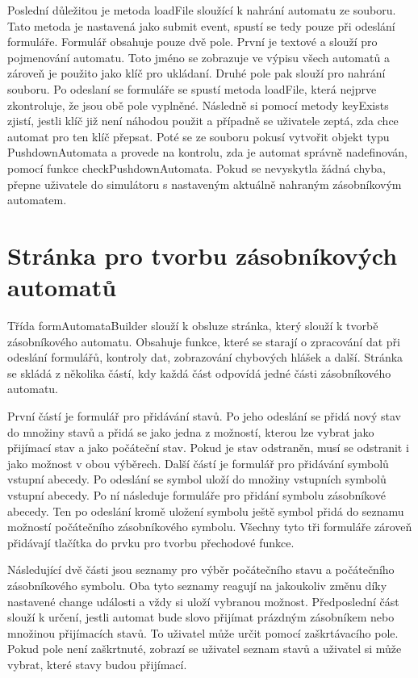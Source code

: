 Poslední důležitou je metoda loadFile sloužící k nahrání automatu ze souboru. Tato metoda je nastavená jako submit event, spustí se tedy pouze při odeslání formuláře. Formulář obsahuje pouze dvě pole. První je textové a slouží pro pojmenování automatu. Toto jméno se zobrazuje ve výpisu všech automatů a zároveň je použito jako klíč pro ukládaní. Druhé pole pak slouží pro nahrání souboru. Po odeslaní se formuláře se spustí metoda loadFile, která nejprve zkontroluje, že jsou obě pole vyplněné. Následně si pomocí metody keyExists zjistí, jestli klíč již není náhodou použit a případně se uživatele zeptá, zda chce automat pro ten klíč přepsat. Poté se ze souboru pokusí vytvořit objekt typu PushdownAutomata a provede na kontrolu, zda je automat správně nadefinován, pomocí funkce checkPushdownAutomata. Pokud se nevyskytla žádná chyba, přepne uživatele do simulátoru s nastaveným aktuálně nahraným zásobníkovým automatem.

\section{Stránka pro tvorbu zásobníkových automatů}\label{sec:PDABuilderImplementation}

Třída formAutomataBuilder slouží k obsluze stránka, který slouží k tvorbě zásobníkového automatu. Obsahuje funkce, které se starají o zpracování dat při odeslání formulářů, kontroly dat, zobrazování chybových hlášek a další. Stránka se skládá z několika částí, kdy každá část odpovídá jedné části zásobníkového automatu. 

První částí je formulář pro přidávání stavů. Po jeho odeslání se přidá nový stav do množiny stavů a přidá se jako jedna z možností, kterou lze vybrat jako přijímací stav a jako počáteční stav. Pokud je stav odstraněn, musí se odstranit i jako možnost v obou výběrech. Další částí je formulář pro přidávání symbolů vstupní abecedy. Po odeslání se symbol uloží do množiny vstupních symbolů vstupní abecedy. Po ní následuje formuláře pro přidání symbolu zásobníkové abecedy. Ten po odeslání kromě uložení symbolu ještě symbol přidá do seznamu možností počátečního zásobníkového symbolu. Všechny tyto tři formuláře zároveň přidávají tlačítka do prvku pro tvorbu přechodové funkce. 

Následující dvě části jsou seznamy pro výběr počátečního stavu a počátečního zásobníkového symbolu. Oba tyto seznamy reagují na jakoukoliv změnu díky nastavené change události a vždy si uloží vybranou možnost. Předposlední část slouží k určení, jestli automat bude slovo přijímat prázdným zásobníkem nebo množinou přijímacích stavů. To uživatel může určit pomocí zaškrtávacího pole. Pokud pole není zaškrtnuté, zobrazí se uživatel seznam stavů a uživatel si může vybrat, které stavy budou přijímací.

